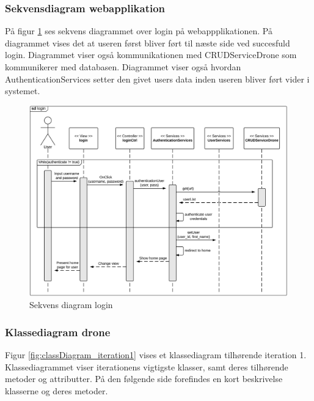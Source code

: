 \newpage

\subsubsection*{Sekvensdiagram webapplikation}
På figur \ref{fig:Sekvens_diagram_login} ses sekvens diagrammet over login på webappplikationen. På diagrammet vises det at useren først bliver ført til næste side ved succesfuld login. Diagrammet viser også kommunikationen med CRUDServiceDrone som kommunikerer med databasen. Diagrammet viser også hvordan AuthenticationServices setter den givet users data inden useren bliver ført vider i systemet.

\begin{figure}[H]
	\centering
	\includegraphics[width=1\textwidth]{Billeder/sekvens/login_sq_diagram.png}
	\caption{Sekvens diagram login}
	\label{fig:Sekvens_diagram_login}
\end{figure}
\newpage


\subsubsection*{Klassediagram drone}
\vspace{-0.2cm}
Figur \ref{fig:classDiagram_iteration1} vises et klassediagram tilhørende iteration 1. Klassediagrammet viser iterationens vigtigste klasser, samt deres tilhørende metoder og attributter. På den følgende side forefindes en kort beskrivelse klasserne og deres metoder.

